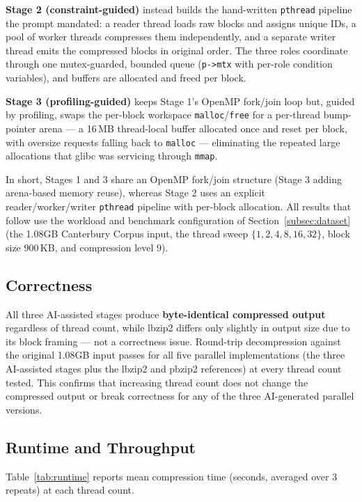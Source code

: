\documentclass[conference]{IEEEtran}
\begin{document}
\textbf{Stage 2 (constraint-guided)} instead builds the hand-written \texttt{pthread} pipeline the prompt mandated: a reader thread loads raw blocks and assigns unique IDs, a pool of worker threads compresses them independently, and a separate writer thread emits the compressed blocks in original order. The three roles coordinate through one mutex-guarded, bounded queue (\texttt{p->mtx} with per-role condition variables), and buffers are allocated and freed per block.

\textbf{Stage 3 (profiling-guided)} keeps Stage 1's OpenMP fork/join loop but, guided by profiling, swaps the per-block workspace \texttt{malloc}/\texttt{free} for a per-thread bump-pointer arena --- a 16\,MB thread-local buffer allocated once and reset per block, with oversize requests falling back to \texttt{malloc} --- eliminating the repeated large allocations that glibc was servicing through \texttt{mmap}.

In short, Stages 1 and 3 share an OpenMP fork/join structure (Stage 3 adding arena-based memory reuse), whereas Stage 2 uses an explicit reader/worker/writer \texttt{pthread} pipeline with per-block allocation. All results that follow use the workload and benchmark configuration of Section~\ref{subsec:dataset} (the 1.08GB Canterbury Corpus input, the thread sweep $\{1, 2, 4, 8, 16, 32\}$, block size 900\,KB, and compression level 9).

\subsection{Correctness}
All three AI-assisted stages produce \textbf{byte-identical compressed output} regardless of thread count, while lbzip2 differs only slightly in output size due to its block framing --- not a correctness issue. Round-trip decompression against the original 1.08GB input passes for all five parallel implementations (the three AI-assisted stages plus the lbzip2 and pbzip2 references) at every thread count tested. This confirms that increasing thread count does not change the compressed output or break correctness for any of the three AI-generated parallel versions.

\subsection{Runtime and Throughput}
Table~\ref{tab:runtime} reports mean compression time (seconds, averaged over 3 repeats) at each thread count.
\end{document}
